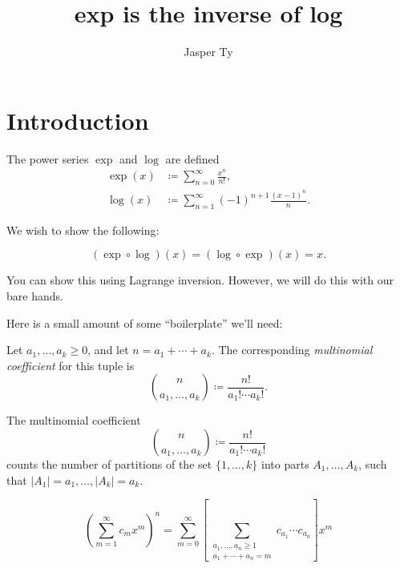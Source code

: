 \documentclass{article}
\title{exp is the inverse of log}
\author{Jasper Ty}
\date{}
\begin{document}
\maketitle

\tableofcontents

\section{Introduction}

\begin{definition}
    The power series $\exp$ and $\log$ are defined
    \begin{align}
        \exp(x)
        &\coloneq
        \sum_{n=0}^\infty
        \frac{x^n}{n!},
        \\
        \log(x)
        &\coloneq
        \sum_{n=1}^\infty
        (-1)^{n+1}
        \frac{(x-1)^n}{n}.
    \end{align}
\end{definition}

We wish to show the following:

\begin{theorem}
    \label{thm}
    \begin{equation}
        (\exp \circ \log)(x)
        =
        (\log \circ \exp)(x)
        =
        x.
    \end{equation}
\end{theorem}

You can show this using Lagrange inversion.
However, we will do this with our bare hands.

Here is a small amount of some ``boilerplate'' we'll need:

\begin{definition}
    Let $a_1,\ldots,a_k \geq 0$, and let $n = a_1 + \cdots + a_k$.
    The corresponding \textit{multinomial coefficient} for this tuple is
    \[
        \binom{n}{a_1,\ldots,a_k}
        \coloneq
        \frac{n!}{a_1! \cdots a_k!}.
    \]
\end{definition}

\begin{proposition}
    The multinomial coefficient 
    \[
        \binom{n}{a_1,\ldots,a_k}
        \coloneq
        \frac{n!}{a_1! \cdots a_k!}
    \]
    counts the number of partitions of the set $\{1, \ldots, k\}$ into parts $A_1, \ldots, A_k$, such that $|A_1| = a_1, \ldots, |A_k| = a_k$.
\end{proposition}

\begin{proposition}
    \begin{equation}
        \label{eq:powerrule}
        \left(
            \sum_{m=1}^\infty
            c_mx^m
        \right)^n
        =
        \sum_{m=0}^\infty
        \left[
            \sum_{
                \substack{
                    a_1,\ldots,a_n \geq 1 \\
                    a_1 + \cdots + a_n = m
                }
            }
            c_{a_1} \cdots c_{a_n}
        \right]
        x^m
    \end{equation}
\end{proposition}
\end{document}
